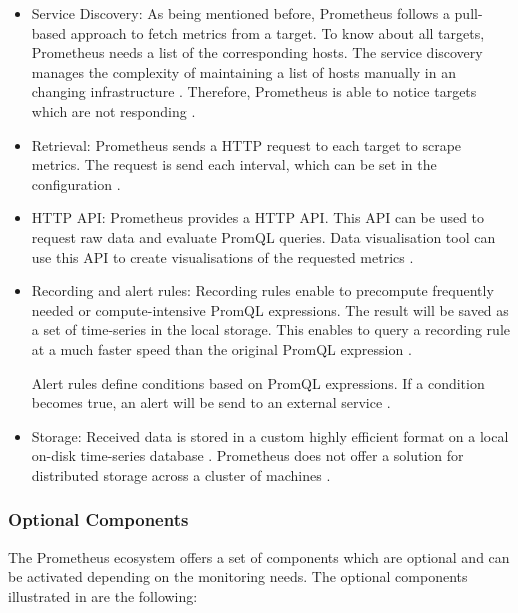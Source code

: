 \begin{itemize}
\item Service Discovery:
As being mentioned before, Prometheus follows a pull-based approach to fetch metrics from a target. To know about all targets, Prometheus needs a list of the corresponding hosts. The service discovery manages the complexity of maintaining a list of hosts manually in an changing infrastructure \cite{Bastos2019Prom}. Therefore, Prometheus is able to notice targets which are not responding \cite{Brazil2018Prom}.

\item Retrieval:
Prometheus sends a HTTP request to each target to scrape metrics. The request is send each interval, which can be set in the configuration \cite{Brazil2018Prom}.

\item HTTP API:
Prometheus provides a HTTP API. This API can be used to request raw data and evaluate PromQL queries.
Data visualisation tool can use this API to create visualisations of the requested metrics \cite{Brazil2018Prom}.

\item Recording and alert rules:
Recording rules enable to precompute frequently needed or compute-intensive PromQL expressions. The result will be saved as a set of time-series in the local storage. This enables to query a recording rule at a much faster speed than the original PromQL expression \cite{Brazil2018Prom, Prom2020Docs}.

Alert rules define conditions based on PromQL expressions. If a condition becomes true, an alert will be send to an external service \cite{Prom2020Docs}.

\item Storage:
Received data is stored in a custom highly efficient format on a local on-disk time-series database \cite{Prom2020Docs}. Prometheus does not offer a solution for distributed storage across a cluster of machines \cite{Brazil2018Prom}.
\end{itemize}


\subsubsection{Optional Components}
The Prometheus ecosystem offers a set of components which are optional and can be activated depending on the monitoring needs.
The optional components illustrated in  are the following:

